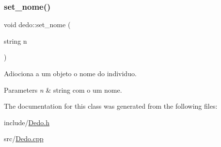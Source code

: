 \subsubsection{\texorpdfstring{set\+\_\+nome()}{set\_nome()}}
{\footnotesize\ttfamily void dedo\+::set\+\_\+nome (\begin{DoxyParamCaption}\item[{string}]{n }\end{DoxyParamCaption})}



Adiociona a um objeto o nome do individuo. 


\begin{DoxyParams}{Parameters}
{\em n} & string com o um nome. \\
\hline
\end{DoxyParams}


The documentation for this class was generated from the following files\+:\begin{DoxyCompactItemize}
\item 
include/\mbox{\hyperlink{_dedo_8h}{Dedo.\+h}}\item 
src/\mbox{\hyperlink{_dedo_8cpp}{Dedo.\+cpp}}\end{DoxyCompactItemize}
